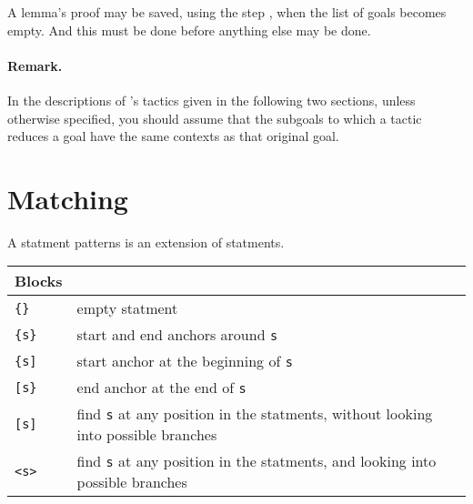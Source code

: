 A lemma's proof may be saved, using the step , when the list
of goals becomes empty. And this must be done before anything else may
be done.

\paragraph{Remark.}
In the descriptions of \EasyCrypt's tactics given in the following two
sections, unless otherwise specified, you should assume that the
subgoals to which a tactic reduces a goal have the same contexts as
that original goal.

\section{Matching}

A statment patterns is an extension of statments.

\begin{tabular}{| l | l |}
  \hline
  Blocks & \\
  \hline
  \texttt{\{\}} & empty statment \\
  \texttt{\{s\}} & start and end anchors around \texttt{s} \\
  \texttt{\{s]} & start anchor at the beginning of \texttt{s} \\
  \texttt{[s\}} & end anchor at the end of \texttt{s} \\
  \texttt{[s]} & find \texttt{s} at any position in the statments, 
                 without looking into possible branches \\
  \texttt{<s>} & find \texttt{s} at any position in the statments, 
                 and looking into possible branches \\
  \hline
\end{tabular}

